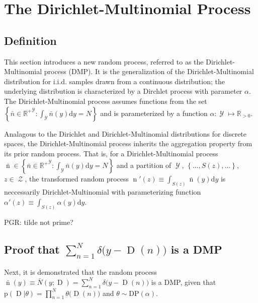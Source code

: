 \documentclass[12pt]{report}
\DeclareMathOperator{\Drm}{\mathrm{D}}
\DeclareMathOperator{\nrm}{\mathrm{n}}
\DeclareMathOperator{\Ycal}{\mathcal{Y}}
\DeclareMathOperator{\Zcal}{\mathcal{Z}}
\begin{document}
\section{The Dirichlet-Multinomial Process} \label{app:DMP}

\subsection{Definition}

This section introduces a new random process, referred to as the Dirichlet-Multinomial process (DMP). It is the generalization of the Dirichlet-Multinomial distribution for i.i.d. samples drawn from a continuous distribution; the underlying distribution is characterized by a Dirchlet process with parameter $\alpha$. The Dirichlet-Multinomial process assumes functions from the set $\left\{ \bar{n} \in {\mathbb{R}^+}^{\Ycal} : \int_{\Ycal} \bar{n}(y) \mathrm{d} y = N \right\}$ and is parameterized by a function $\alpha : \Ycal \mapsto \mathbb{R}_{>0}$.

Analagous to the Dirichlet and Dirichlet-Multinomial distributions for discrete spaces, the Dirichlet-Multinomial process inherits the aggregation property from its prior random process. That is, for a Dirichlet-Multinomial process $\bar{\nrm} \in \left\{ \bar{n} \in {\mathbb{R}^+}^{\Ycal} : \int_{\Ycal} \bar{n}(y) \mathrm{d} y = N \right\}$ and a partition of $\Ycal$, $\left\{ \ldots,S(z),\ldots \right\}$, $z \in \Zcal$, the transformed random process $\nrm'(z) \equiv \int_{S(z)} \bar{\nrm}(y) \mathrm{d} y$ is neccessarily Dirichlet-Multinomial with parameterizing function $\alpha'(z) \equiv \int_{S(z)} \alpha(y) \mathrm{d} y$.

PGR: tilde not prime?

\subsection{Proof that $\sum_{n=1}^N \delta\big( y-\Drm(n) \big)$ is a DMP}

Next, it is demonstrated that the random process $\bar{\nrm}(y) \equiv \bar{N}(y;\Drm) = \sum_{n=1}^N \delta\big( y-\Drm(n) \big)$ is a DMP, given that $\text{p}(\Drm|\theta) = \prod_{n=1}^N \theta\big( \Drm(n) \big)$ and $\theta \sim \text{DP}(\alpha)$. 
\end{document}
